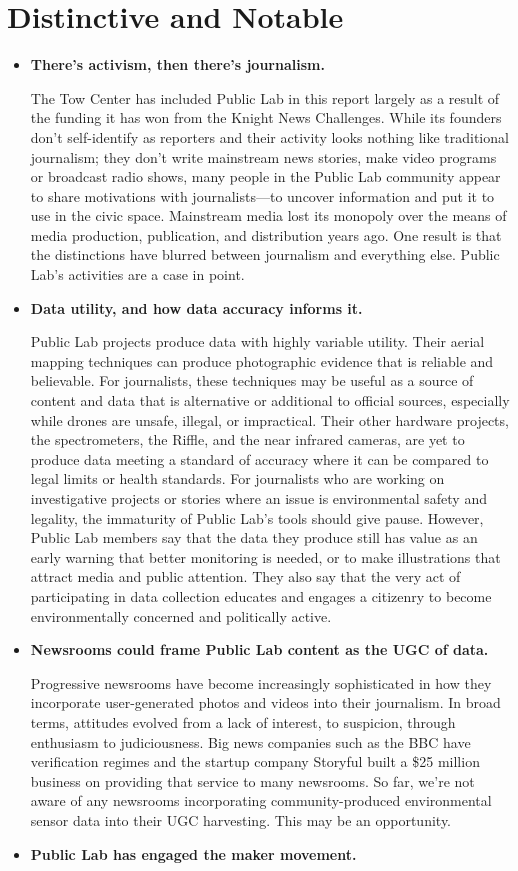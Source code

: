 \section{Distinctive and Notable}
\begin{itemize}
\item \textbf{There's activism, then there's journalism.}

The Tow Center has included Public Lab in this report largely as a
result of the funding it has won from the Knight News Challenges.
While its founders don't self-identify as reporters and their activity
looks nothing like traditional journalism; they don't write mainstream
news stories, make video programs or broadcast radio shows, many
people in the Public Lab community appear to share motivations
with journalists—to uncover information and put it to use in the civic
space. Mainstream media lost its monopoly over the means of media
production, publication, and distribution years ago. One result is that
the distinctions have blurred between journalism and everything else.
Public Lab's activities are a case in point.
\item \textbf{Data utility, and how data accuracy informs it.}

Public Lab projects produce data with highly variable utility. Their
aerial mapping techniques can produce photographic evidence that is
reliable and believable. For journalists, these techniques may be useful
as a source of content and data that is alternative or additional to official
sources, especially while drones are unsafe, illegal, or impractical.
Their other hardware projects, the spectrometers, the Riffle, and the
near infrared cameras, are yet to produce data meeting a standard of
accuracy where it can be compared to legal limits or health standards.
For journalists who are working on investigative projects or stories
where an issue is environmental safety and legality, the immaturity
of Public Lab's tools should give pause. However, Public Lab members
say that the data they produce still has value as an early warning
that better monitoring is needed, or to make illustrations that attract
media and public attention. They also say that the very act of participating
in data collection educates and engages a citizenry to become
environmentally concerned and politically active.
\item \textbf{Newsrooms could frame Public Lab content as the UGC of data.}

Progressive newsrooms have become increasingly sophisticated in
how they incorporate user-generated photos and videos into their
journalism. In broad terms, attitudes evolved from a lack of interest,
to suspicion, through enthusiasm to judiciousness. Big news companies
such as the BBC have verification regimes and the startup company
Storyful built a \$25 million business on providing that service to
many newsrooms. So far, we're not aware of any newsrooms incorporating
community-produced environmental sensor data into their
UGC harvesting. This may be an opportunity.
\item \textbf{Public Lab has engaged the maker movement.}


\end{itemize}
